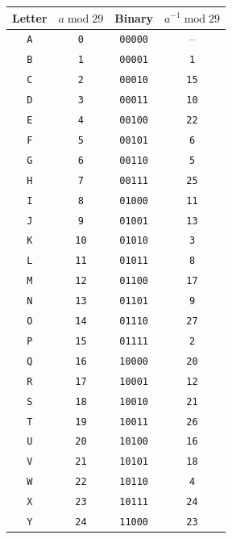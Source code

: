 \documentclass{book}
\theoremstyle{plain}
\theoremstyle{definition}
\renewcommand{\mod}{\operatorname{mod}}
\renewcommand{\mod}{\operatorname{mod}}
\begin{document}
\begin{center}
\begin{tabular}{cccc}
Letter & $a \mod 29$ & Binary & $a^{-1} \mod 29$ \\
\hline
\texttt{A}  & \texttt{0}  & \texttt{00000} & -- \\
\texttt{B}  & \texttt{1}  & \texttt{00001} & \texttt{1} \\
\texttt{C}  & \texttt{2}  & \texttt{00010} & \texttt{15} \\
\texttt{D}  & \texttt{3}  & \texttt{00011} & \texttt{10} \\
\texttt{E}  & \texttt{4}  & \texttt{00100} & \texttt{22} \\
\texttt{F}  & \texttt{5}  & \texttt{00101} & \texttt{6} \\
\texttt{G}  & \texttt{6}  & \texttt{00110} & \texttt{5} \\
\texttt{H}  & \texttt{7}  & \texttt{00111} & \texttt{25} \\
\texttt{I}  & \texttt{8}  & \texttt{01000} & \texttt{11} \\
\texttt{J}  & \texttt{9}  & \texttt{01001} & \texttt{13} \\
\texttt{K}  & \texttt{10} & \texttt{01010} & \texttt{3} \\
\texttt{L}  & \texttt{11} & \texttt{01011} & \texttt{8} \\
\texttt{M}  & \texttt{12} & \texttt{01100} & \texttt{17} \\
\texttt{N}  & \texttt{13} & \texttt{01101} & \texttt{9} \\
\texttt{O}  & \texttt{14} & \texttt{01110} & \texttt{27} \\
\texttt{P}  & \texttt{15} & \texttt{01111} & \texttt{2} \\
\texttt{Q}  & \texttt{16} & \texttt{10000} & \texttt{20} \\
\texttt{R}  & \texttt{17} & \texttt{10001} & \texttt{12} \\
\texttt{S}  & \texttt{18} & \texttt{10010} & \texttt{21} \\
\texttt{T}  & \texttt{19} & \texttt{10011} & \texttt{26} \\
\texttt{U}  & \texttt{20} & \texttt{10100} & \texttt{16} \\
\texttt{V}  & \texttt{21} & \texttt{10101} & \texttt{18} \\
\texttt{W}  & \texttt{22} & \texttt{10110} & \texttt{4} \\
\texttt{X}  & \texttt{23} & \texttt{10111} & \texttt{24} \\
\texttt{Y}  & \texttt{24} & \texttt{11000} & \texttt{23} \\

\end{tabular}
\end{center}
\end{document}
